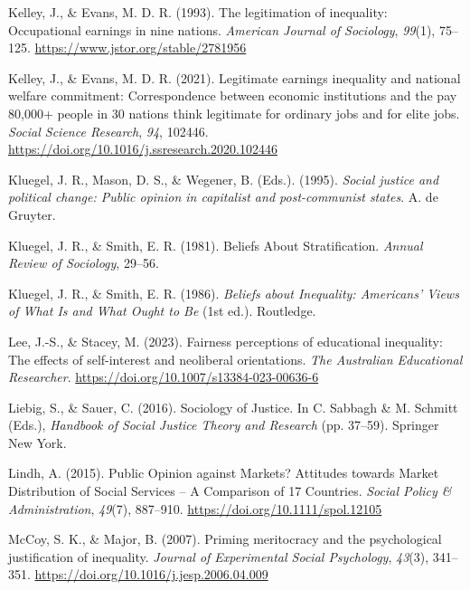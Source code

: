 \documentclass[
  12pt,
  a4paper,
]{article}
\newlength{\cslhangindent}
\newenvironment{CSLReferences}[2] %
 {%
  \setlength{\parindent}{0pt}
  \ifodd #1 \everypar{\setlength{\hangindent}{\cslhangindent}}\ignorespaces\fi
  \ifnum #2 > 0
  \setlength{\parskip}{#2\baselineskip}
  \fi
 }%
 {}
\begin{document}
\begin{CSLReferences}{1}{0}
Kelley, J., \& Evans, M. D. R. (1993). The legitimation of inequality: {Occupational} earnings in nine nations. \emph{American Journal of Sociology}, \emph{99}(1), 75--125. \url{https://www.jstor.org/stable/2781956}

Kelley, J., \& Evans, M. D. R. (2021). Legitimate earnings inequality and national welfare commitment: {Correspondence} between economic institutions and the pay 80,000+ people in 30 nations think legitimate for ordinary jobs and for elite jobs. \emph{Social Science Research}, \emph{94}, 102446. \url{https://doi.org/10.1016/j.ssresearch.2020.102446}

Kluegel, J. R., Mason, D. S., \& Wegener, B. (Eds.). (1995). \emph{Social justice and political change: Public opinion in capitalist and post-communist states}. A. de Gruyter.

Kluegel, J. R., \& Smith, E. R. (1981). Beliefs {About Stratification}. \emph{Annual Review of Sociology}, 29--56.

Kluegel, J. R., \& Smith, E. R. (1986). \emph{Beliefs about {Inequality}: {Americans}' {Views} of {What Is} and {What Ought} to {Be}} (1st ed.). Routledge.

Lee, J.-S., \& Stacey, M. (2023). Fairness perceptions of educational inequality: The effects of self-interest and neoliberal orientations. \emph{The Australian Educational Researcher}. \url{https://doi.org/10.1007/s13384-023-00636-6}

Liebig, S., \& Sauer, C. (2016). Sociology of {Justice}. In C. Sabbagh \& M. Schmitt (Eds.), \emph{Handbook of {Social Justice Theory} and {Research}} (pp. 37--59). Springer New York.

Lindh, A. (2015). Public {Opinion} against {Markets}? {Attitudes} towards {Market Distribution} of {Social Services} -- {A Comparison} of 17 {Countries}. \emph{Social Policy \& Administration}, \emph{49}(7), 887--910. \url{https://doi.org/10.1111/spol.12105}

McCoy, S. K., \& Major, B. (2007). Priming meritocracy and the psychological justification of inequality. \emph{Journal of Experimental Social Psychology}, \emph{43}(3), 341--351. \url{https://doi.org/10.1016/j.jesp.2006.04.009}


\end{CSLReferences}
\end{document}
